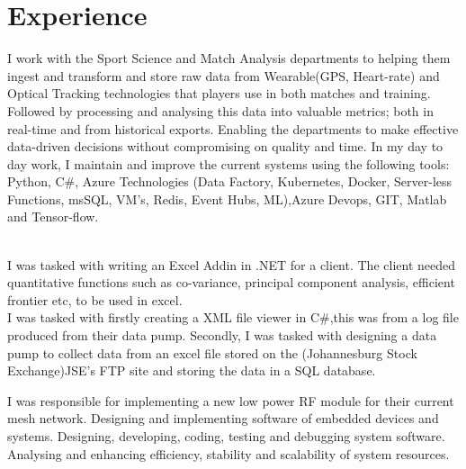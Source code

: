 \documentclass[]{deedy-resume-openfont}
\begin{document}
\begin{minipage}[t]{0.66\textwidth} 


\section{Experience}

I work with the Sport Science and Match Analysis departments to helping them ingest and transform and store raw data from Wearable(GPS, Heart-rate) and Optical Tracking technologies that players use in both matches and training. Followed by processing and analysing this data into valuable metrics; both in real-time and from historical exports. Enabling the departments to make effective data-driven decisions without compromising on quality and time. In my day to day work, I maintain and improve the current systems using the following tools: Python, C\#, Azure Technologies (Data Factory, Kubernetes, Docker, Server-less Functions, msSQL, VM's, Redis, Event Hubs, ML),Azure Devops, GIT, Matlab and Tensor-flow.
\sectionsep

\\
I was tasked with writing an Excel Addin in .NET for a client. The client needed quantitative functions such as co-variance, principal component analysis, efficient frontier etc, to be used in excel.
\sectionsep
\\
I was tasked with firstly creating a XML file viewer in C\#,this was from a log file produced from their data pump. Secondly, I was tasked with designing a data pump to collect data from an excel file stored on the (Johannesburg Stock Exchange)JSE’s FTP site and storing the data in a SQL database.
\sectionsep

I was responsible for implementing a new low power RF module for their current mesh network. Designing and implementing software of embedded devices and systems. Designing, developing, coding, testing and debugging system software. Analysing and enhancing efficiency, stability and scalability of system resources.
\sectionsep


\end{minipage}
\end{document}
